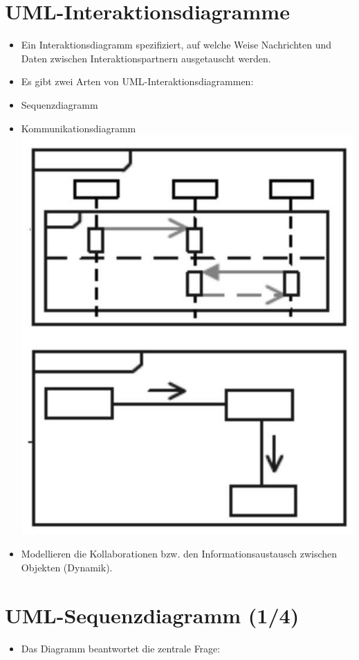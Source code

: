 \documentclass[10pt]{article}
\begin{document}
\section*{UML-Interaktionsdiagramme}
\begin{itemize}
  \item Ein Interaktionsdiagramm spezifiziert, auf welche Weise Nachrichten und Daten zwischen Interaktionspartnern ausgetauscht werden.
  \item Es gibt zwei Arten von UML-Interaktionsdiagrammen:
  \item Sequenzdiagramm
  \item Kommunikationsdiagramm\\
\includegraphics[width=\linewidth]{images/2025_01_02_787afb9584031d2940deg-14}
  \item Modellieren die Kollaborationen bzw. den Informationsaustausch zwischen Objekten (Dynamik).
\end{itemize}

\section*{UML-Sequenzdiagramm (1/4)}
\begin{itemize}
  \item Das Diagramm beantwortet die zentrale Frage:
\end{itemize}
\end{document}

